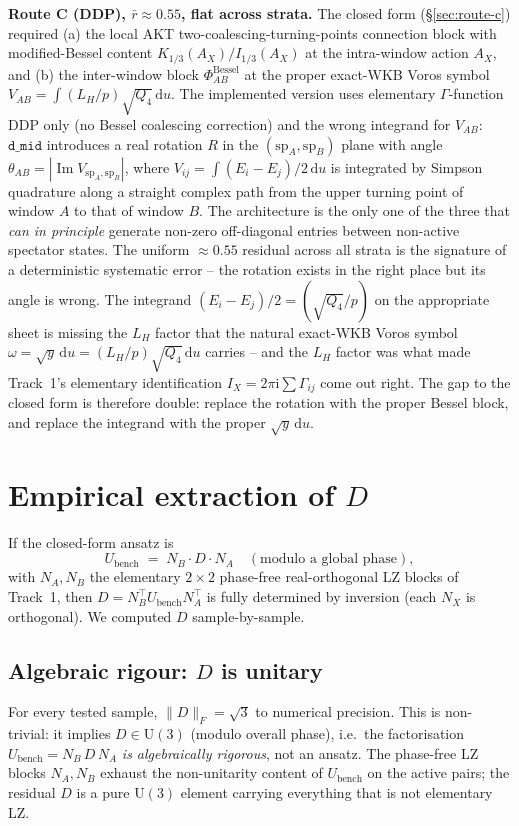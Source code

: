 \documentclass[11pt]{article}
\newcommand{\ii}{\mathrm i}\newcommand{\dd}{\mathrm d}
\newcommand{\im}{\operatorname{Im}}
\begin{document}
\textbf{Route C (DDP), $\bar r\approx 0.55$, flat across strata.} The
closed form (\S\ref{sec:route-c}) required (a) the local AKT
two-coalescing-turning-points connection block with modified-Bessel
content $K_{1/3}(A_X)/I_{1/3}(A_X)$ at the intra-window action $A_X$,
and (b) the inter-window block $\Phi_{AB}^{\text{Bessel}}$ at the
proper exact-WKB Voros symbol
$V_{AB} = \int(L_H/p)\sqrt{Q_4}\,\dd u$. The implemented version uses
elementary $\Gamma$-function DDP only (no Bessel coalescing
correction) and the wrong integrand for $V_{AB}$:
$\texttt{d\_mid}$ introduces a real rotation $R$ in the
$(\mathrm{sp}_A,\mathrm{sp}_B)$ plane with angle
$\theta_{AB}=|\im V_{\mathrm{sp}_A,\mathrm{sp}_B}|$, where
$V_{ij} = \int (E_i-E_j)/2\,\dd u$ is integrated by Simpson
quadrature along a straight complex path from the upper turning
point of window $A$ to that of window $B$. The architecture is the
only one of the three that \emph{can in principle} generate
non-zero off-diagonal entries between non-active spectator states.
The uniform $\approx 0.55$ residual across all strata is the
signature of a deterministic systematic error -- the rotation exists
in the right place but its angle is wrong. The integrand
$(E_i-E_j)/2 = (\sqrt{Q_4}/p)$ on the appropriate sheet is missing
the $L_H$ factor that the natural exact-WKB Voros symbol
$\omega = \sqrt y\,\dd u = (L_H/p)\sqrt{Q_4}\,\dd u$ carries -- and
the $L_H$ factor was what made Track~1's elementary identification
$I_X = 2\pi\ii\sum\Gamma_{ij}$ come out right. The gap to the
closed form is therefore double: replace the rotation with the
proper Bessel block, and replace the integrand with the proper
$\sqrt y\,\dd u$.

\section{Empirical extraction of $D$}

If the closed-form ansatz is
\[
U_{\text{bench}} \;=\; N_B \cdot D \cdot N_A
\quad(\text{modulo a global phase}),
\]
with $N_A,N_B$ the elementary $2\times2$ phase-free real-orthogonal LZ
blocks of Track~1, then $D = N_B^{\top} U_{\text{bench}} N_A^{\top}$ is
fully determined by inversion (each $N_X$ is orthogonal). We computed
$D$ sample-by-sample.

\subsection{Algebraic rigour: $D$ is unitary}

For every tested sample, $\|D\|_F = \sqrt 3$ to numerical precision.
This is non-trivial: it implies $D\in \mathrm U(3)$ (modulo overall
phase), i.e.\ the factorisation
$U_{\text{bench}} = N_B\,D\,N_A$ \emph{is algebraically rigorous}, not
an ansatz. The phase-free LZ blocks $N_A,N_B$ exhaust the
non-unitarity content of $U_{\text{bench}}$ on the active pairs; the
residual $D$ is a pure $\mathrm U(3)$ element carrying everything that
is not elementary LZ.
\end{document}

